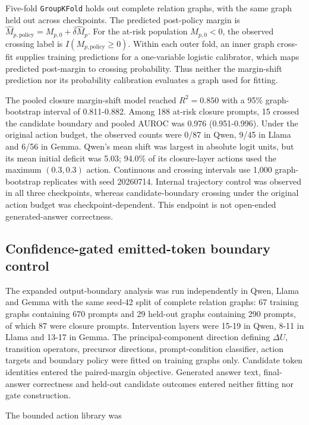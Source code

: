 \documentclass[10pt]{article}
\begin{document}
Five-fold \texttt{GroupKFold} holds out complete relation graphs, with the same graph held out across checkpoints. The predicted post-policy margin is \(\widehat M_{p,\mathrm{policy}}=M_{p,0}+\widehat{\delta M}_p\). For the at-risk population \(M_{p,0}<0\), the observed crossing label is \(I(M_{p,\mathrm{policy}}\geq0)\). Within each outer fold, an inner graph cross-fit supplies training predictions for a one-variable logistic calibrator, which maps predicted post-margin to crossing probability. Thus neither the margin-shift prediction nor its probability calibration evaluates a graph used for fitting.

The pooled closure margin-shift model reached \(R^2=0.850\) with a 95\% graph-bootstrap interval of 0.811-0.882. Among 188 at-risk closure prompts, 15 crossed the candidate boundary and pooled AUROC was 0.976 (0.951-0.996). Under the original action budget, the observed counts were 0/87 in Qwen, 9/45 in Llama and 6/56 in Gemma. Qwen's mean shift was largest in absolute logit units, but its mean initial deficit was 5.03; 94.0\% of its closure-layer actions used the maximum \((0.3,0.3)\) action. Continuous and crossing intervals use 1,000 graph-bootstrap replicates with seed 20260714. Internal trajectory control was observed in all three checkpoints, whereas candidate-boundary crossing under the original action budget was checkpoint-dependent. This endpoint is not open-ended generated-answer correctness.

\subsection*{Confidence-gated emitted-token boundary control}

The expanded output-boundary analysis was run independently in Qwen, Llama and Gemma with the same seed-42 split of complete relation graphs: 67 training graphs containing 670 prompts and 29 held-out graphs containing 290 prompts, of which 87 were closure prompts. Intervention layers were 15-19 in Qwen, 8-11 in Llama and 13-17 in Gemma. The principal-component direction defining \(\Delta U\), transition operators, precursor directions, prompt-condition classifier, action targets and boundary policy were fitted on training graphs only. Candidate token identities entered the paired-margin objective. Generated answer text, final-answer correctness and held-out candidate outcomes entered neither fitting nor gate construction.

The bounded action library was
\end{document}
